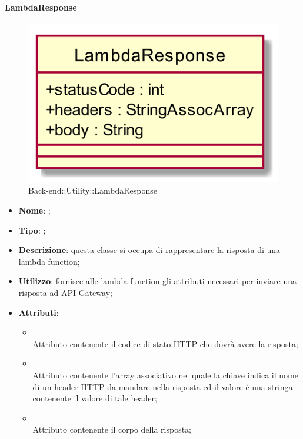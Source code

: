 \hypertarget{LambdaResponse_label}{\paragraph{LambdaResponse}}
\begin{figure}[h]
	\centering
	\includegraphics[width=\textwidth,height=\textheight,keepaspectratio]{images/ClassLambdaResponse.png}
	\caption{Back-end::Utility::LambdaResponse}
\end{figure}
\begin{itemize}
	\item \textbf{Nome}: ;
	\item \textbf{Tipo}: ;
	\item \textbf{Descrizione}: questa classe si occupa di rappresentare la risposta di una lambda function;
	\item \textbf{Utilizzo}: fornisce alle lambda function gli attributi necessari per inviare una risposta ad API Gateway;
	\item \textbf{Attributi}:
	\begin{itemize}
		\item[]  \\
		Attributo contenente il codice di stato HTTP che dovrà avere la risposta;
		\item[]  \\
		Attributo contenente l'array associativo nel quale la chiave indica il nome di un header HTTP da mandare nella risposta ed il valore è una stringa contenente il valore di tale header;
		\item[]  \\
		Attributo contenente il corpo della risposta;
	\end{itemize}
\end{itemize}

